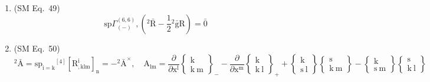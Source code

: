 \documentclass[12pt]{article}
\begin{document}
\begin{enumerate}[label=(\arabic*), series=formellist]
    \item (SM Eq.\ 49) 
    \[
    \mathrm{sp} \Gamma^{(6,6)}_{(-)}, \left( {}^2\bar{\mathrm{R}} - \frac{1}{2}{}^2\bar{\mathrm{g}}\mathrm{R} \right) = \bar{0}
    \]

    \item (SM Eq.\ 50) 
    \[
    {}^2\bar{\mathrm{A}} = \mathrm{sp}_{\mathrm{i=k}} {}^{[4]}\left[ \mathrm{R}^\mathrm{i}_{\mathrm{,klm}} \right]_\mathrm{n} = -{}^2\bar{\mathrm{A}}^\times, \quad \mathrm{A}_{\mathrm{lm}} = \frac{\partial}{\partial \mathrm{x^l}}\left\{ \begin{smallmatrix} \mathrm{k} \\ \mathrm{k\ m} \end{smallmatrix} \right\}_- - \frac{\partial}{\partial \mathrm{x^m}}\left\{ \begin{smallmatrix} \mathrm{k} \\ \mathrm{k\ l} \end{smallmatrix} \right\}_+ + \left\{ \begin{smallmatrix} \mathrm{k} \\ \mathrm{s\ l} \end{smallmatrix} \right\}\left\{ \begin{smallmatrix} \mathrm{s} \\ \mathrm{k\ m} \end{smallmatrix} \right\} - \left\{ \begin{smallmatrix} \mathrm{k} \\ \mathrm{s\ m} \end{smallmatrix} \right\}\left\{ \begin{smallmatrix} \mathrm{s} \\ \mathrm{k\ l} \end{smallmatrix} \right\}
    \]


\end{enumerate}
\end{document}
